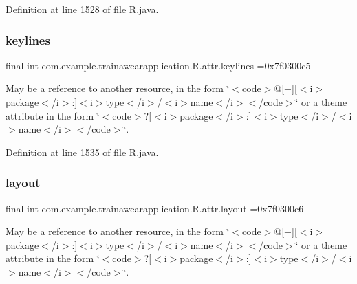 Definition at line 1528 of file R.\+java.

\mbox{\label{classcom_1_1example_1_1trainawearapplication_1_1_r_1_1attr_afae5632614c6ea1d35d0f93841099ba3}} 
\subsubsection{\texorpdfstring{keylines}{keylines}}
{\footnotesize\ttfamily final int com.\+example.\+trainawearapplication.\+R.\+attr.\+keylines =0x7f0300c5\hspace{0.3cm}{\ttfamily [static]}}

May be a reference to another resource, in the form \char`\"{}$<$code$>$@\mbox{[}+\mbox{]}\mbox{[}$<$i$>$package$<$/i$>$\+:\mbox{]}$<$i$>$type$<$/i$>$/$<$i$>$name$<$/i$>$$<$/code$>$\char`\"{} or a theme attribute in the form \char`\"{}$<$code$>$?\mbox{[}$<$i$>$package$<$/i$>$\+:\mbox{]}$<$i$>$type$<$/i$>$/$<$i$>$name$<$/i$>$$<$/code$>$\char`\"{}. 

Definition at line 1535 of file R.\+java.

\mbox{\label{classcom_1_1example_1_1trainawearapplication_1_1_r_1_1attr_aa64f605ae1fcd6070e553cfdcbd37759}} 
\subsubsection{\texorpdfstring{layout}{layout}}
{\footnotesize\ttfamily final int com.\+example.\+trainawearapplication.\+R.\+attr.\+layout =0x7f0300c6\hspace{0.3cm}{\ttfamily [static]}}

May be a reference to another resource, in the form \char`\"{}$<$code$>$@\mbox{[}+\mbox{]}\mbox{[}$<$i$>$package$<$/i$>$\+:\mbox{]}$<$i$>$type$<$/i$>$/$<$i$>$name$<$/i$>$$<$/code$>$\char`\"{} or a theme attribute in the form \char`\"{}$<$code$>$?\mbox{[}$<$i$>$package$<$/i$>$\+:\mbox{]}$<$i$>$type$<$/i$>$/$<$i$>$name$<$/i$>$$<$/code$>$\char`\"{}. 

